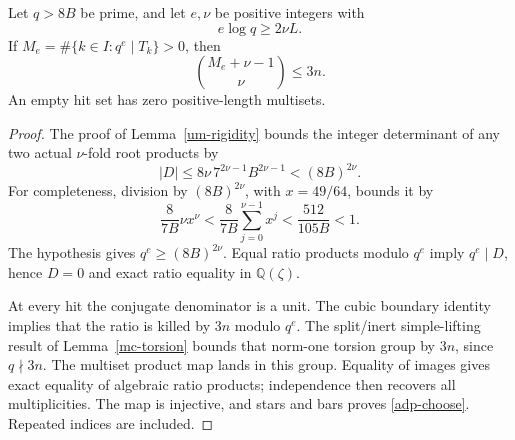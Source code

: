 \begin{lemma}\label{adp-precision}
Let \(q>8B\) be prime, and let \(e,\nu\) be positive integers with
\[
 e\log q\geq2\nu L.
\]
If \(M_e=\#\{k\in I:q^e\mid T_k\}>0\), then
\begin{equation}\label{adp-choose}
 \binom{M_e+\nu-1}{\nu}\leq3n.
\end{equation}
An empty hit set has zero positive-length multisets.
\end{lemma}
\begin{proof}
The proof of Lemma~\ref{um-rigidity} bounds the integer determinant
of any two actual \(\nu\)-fold root products by
\[
 |D|\leq8\nu\,7^{2\nu-1}B^{2\nu-1}<(8B)^{2\nu}.
\]
For completeness, division by \((8B)^{2\nu}\), with \(x=49/64\),
bounds it by
\[
 \frac8{7B}\nu x^\nu
 <\frac8{7B}\sum_{j=0}^{\nu-1}x^j
 <\frac{512}{105B}<1.
\]
The hypothesis gives \(q^e\geq(8B)^{2\nu}\). Equal ratio products
modulo \(q^e\) imply \(q^e\mid D\), hence \(D=0\) and exact ratio
equality in \(\mathbb Q(\zeta)\).

At every hit the conjugate denominator is a unit. The cubic boundary
identity implies that the ratio is killed by \(3n\) modulo \(q^e\).
The split/inert simple-lifting result of Lemma~\ref{mc-torsion}
bounds that norm-one torsion group by \(3n\), since \(q\nmid3n\).
The multiset product map lands in this group. Equality of images
gives exact equality of algebraic ratio products; independence then
recovers all multiplicities. The map is injective, and stars and
bars proves \eqref{adp-choose}. Repeated indices are included.
\end{proof}

